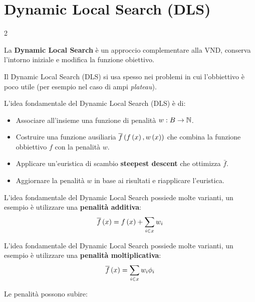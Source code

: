 \documentclass[\main/main.tex]{subfiles}
\begin{document}
\section{Dynamic Local Search (DLS)}
\begin{multicols}{2}
\begin{observation}
    La \textbf{Dynamic Local Search} è un approccio complementare alla VND, conserva l'intorno iniziale e modifica la funzione obiettivo.
\end{observation}
\begin{observation}
    Il Dynamic Local Search (DLS) si usa spesso nei problemi in cui l'obbiettivo è poco utile (per esempio nel caso di ampi \textit{plateau}).
\end{observation}
\begin{observation}
    L'idea fondamentale del Dynamic Local Search (DLS) è di:
    \begin{itemize}
        \item Associare all'insieme una funzione di penalità \(w: B \rightarrow \mathbb{N}\).
        \item Costruire una funzione ausiliaria \(\overline{f}\left(f\left(x\right), w\left(x\right)\right)\) che combina la funzione obbiettivo \(f\) con la penalità \(w\).
        \item Applicare un'euristica di scambio \textbf{steepest descent} che ottimizza \(\bar{f}\).
        \item Aggiornare la penalità \(w\) in base ai risultati e riapplicare l'euristica.
    \end{itemize}
\end{observation}
\begin{definition}
    L'idea fondamentale del Dynamic Local Search possiede molte varianti, un esempio è utilizzare una \textbf{penalità additiva}:
     \[
        \overline{f}\left(x\right) = f\left(x\right) + \sum_{i \in x} w_i
    \]
\end{definition}
\begin{definition}
    L'idea fondamentale del Dynamic Local Search possiede molte varianti, un esempio è utilizzare una \textbf{penalità moltiplicativa}:
     \[
       \overline{f}\left(x\right) = \sum_{i \in x} w_i \phi_i
    \]
\end{definition}
\begin{observation}
    Le penalità possono subire:

\end{observation}
\end{multicols}
\end{document}
